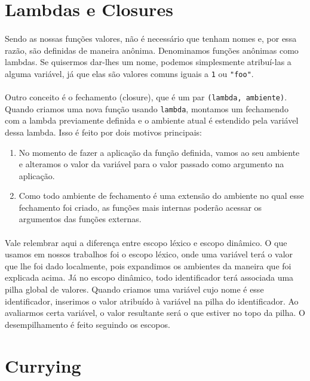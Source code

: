 \documentclass[11pt]{article}
\begin{document}
\section{Lambdas e Closures}
\label{sec:org83183b7}
\paragraph{} Sendo as nossas funções valores, não é necessário que tenham nomes e, por essa razão, são definidas de maneira anônima. Denominamos funções anônimas como lambdas. Se quisermos dar-lhes um nome, podemos simplesmente atribuí-las a alguma variável, já que
elas são valores comuns iguais a \texttt{1} ou \texttt{"foo"}.

\paragraph{} Outro conceito é o fechamento (closure), que é um par \texttt{(lambda, ambiente)}. Quando criamos uma nova função
usando \texttt{lambda}, montamos um fechamendo com a lambda previamente definida e o ambiente atual é estendido pela variável dessa lambda.
Isso é feito por dois motivos principais:
\begin{enumerate}
\item No momento de fazer a aplicação da função definida, vamos ao seu ambiente e alteramos o valor da variável para o valor passado como argumento na aplicação.
\item Como todo ambiente de fechamento é uma extensão do ambiente no qual esse fechamento foi criado, as funções mais internas poderão acessar os argumentos das funções externas.
\end{enumerate}

\paragraph{} Vale relembrar aqui a diferença entre escopo léxico e escopo dinâmico. O que usamos em nossos trabalhos foi o escopo léxico, onde uma
variável terá o valor que lhe foi dado localmente, pois expandimos os ambientes da maneira que foi explicada acima. Já no escopo dinâmico,
todo identificador terá associada uma pilha global de valores. Quando criamos uma variável cujo nome é esse identificador, inserimos o
valor atribuído à variável na pilha do identificador. Ao avaliarmos certa variável, o valor resultante será o que estiver no
topo da pilha. O desempilhamento é feito seguindo os escopos.

\section{Currying}
\label{sec:orgf69b16d}
\end{document}

